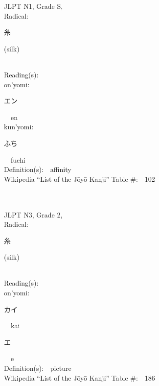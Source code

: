 \begin{multicols}{2}
{JLPT N1, Grade S, \\Radical:\ \ {\begin{CJK}{UTF8}{min} 糸 \end{CJK}} (silk) } \\
Reading(s):\ \ \\
{\hspace*{1em}}on'yomi:\ \ \\
{\hspace*{2em}}{\begin{CJK}{UTF8}{min} エン \end{CJK}}\ \ en\ \ \\
{\hspace*{1em}}kun'yomi:\ \ \\
{\hspace*{2em}}{\begin{CJK}{UTF8}{min} ふち \end{CJK}}\ \ fuchi\ \ \\
Definition(s):\ \ affinity \\
Wikipedia ``List of the J\=oy\=o Kanji'' Table \#:\ \ 102 \\
\ \ \\
{\fontsize{34pt}{40pt}  }\ \ \\  %
{JLPT N3, Grade 2, \\Radical:\ \ {\begin{CJK}{UTF8}{min} 糸 \end{CJK}} (silk) } \\
Reading(s):\ \ \\
{\hspace*{1em}}on'yomi:\ \ \\
{\hspace*{2em}}{\begin{CJK}{UTF8}{min} カイ \end{CJK}}\ \ kai\ \ \\
{\hspace*{2em}}{\begin{CJK}{UTF8}{min} エ \end{CJK}}\ \ e\ \ \\
Definition(s):\ \ picture \\
Wikipedia ``List of the J\=oy\=o Kanji'' Table \#:\ \ 186 \\
\ \ \\
{\fontsize{34pt}{40pt}  }\ \ \\  %

\end{multicols}
